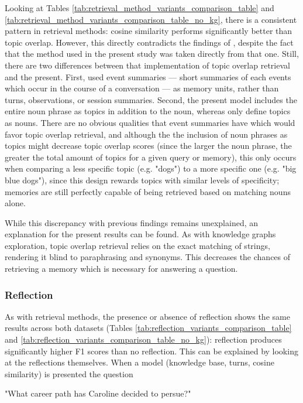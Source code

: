 Looking at Tables \ref{tab:retrieval_method_variants_comparison_table} and \ref{tab:retrieval_method_variants_comparison_table_no_kg}, there is a consistent pattern in retrieval methods: cosine similarity performs significantly better than topic overlap. However, this directly contradicts the findings of \cite{Li2024}, despite the fact that the method used in the present study was taken directly from that one. Still, there are two differences between that implementation of topic overlap retrieval and the present. First, \cite{Li2024} used event summaries — short summaries of each events which occur in the course of a conversation — as memory units, rather than turns, observations, or session summaries. Second, the present model includes the entire noun phrase as topics in addition to the noun, whereas \cite{Li2024} only define topics as nouns. There are no obvious qualities that event summaries have which would favor topic overlap retrieval, and although the the inclusion of noun phrases as topics might decrease topic overlap scores (since the larger the noun phrase, the greater the total amount of topics for a given query or memory), this only occurs when comparing a less specific topic (e.g. "dogs") to a more specific one (e.g. "big blue dogs"), since this design rewards topics with similar levels of specificity; memories are still perfectly capable of being retrieved based on matching nouns alone.
 
While this discrepancy with previous findings remains unexplained, an explanation for the present results can be found. As with knowledge graphs exploration, topic overlap retrieval relies on the exact matching of strings, rendering it blind to paraphrasing and synonyms. This decreases the chances of retrieving a memory which is necessary for answering a question.


\subsubsection{Reflection}

As with retrieval methods, the presence or absence of reflection shows the same results across both datasets (Tables \ref{tab:reflection_variants_comparison_table} and \ref{tab:reflection_variants_comparison_table_no_kg}): reflection produces significantly higher F1 scores than no reflection. This can be explained by looking at the reflections themselves. When a model (knowledge base, turns, cosine similarity) is presented the question

\begin{displayquote}
"What career path has Caroline decided to persue?"
\end{displayquote}


